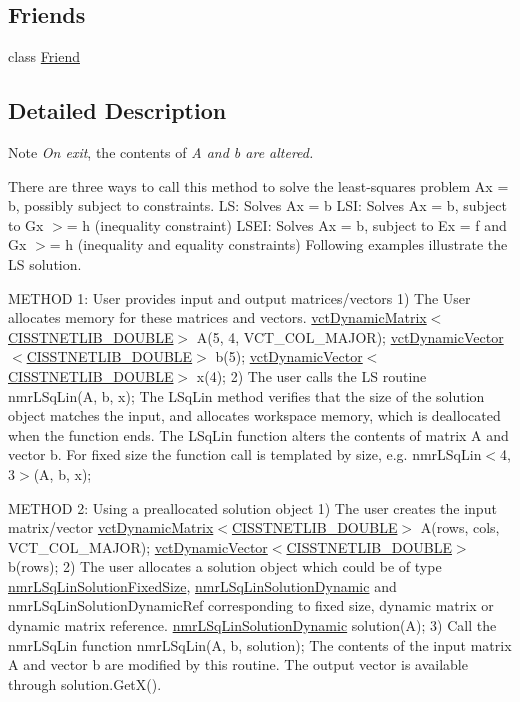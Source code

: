 \subsection*{Friends}
\begin{DoxyCompactItemize}
\item 
class \hyperlink{classnmr_l_sq_lin_solution_dynamic_a7f8321d57e81bc613d5dbef3410ba70e}{Friend}
\end{DoxyCompactItemize}


\subsection{Detailed Description}
\begin{DoxyNote}{Note}
{\itshape On exit}, the contents of {\itshape A and b are altered.}
\end{DoxyNote}
There are three ways to call this method to solve the least-\/squares problem Ax = b, possibly subject to constraints. L\-S\-: Solves Ax = b L\-S\-I\-: Solves Ax = b, subject to Gx $>$= h (inequality constraint) L\-S\-E\-I\-: Solves Ax = b, subject to Ex = f and Gx $>$= h (inequality and equality constraints) Following examples illustrate the L\-S solution.

M\-E\-T\-H\-O\-D 1\-: User provides input and output matrices/vectors 1) The User allocates memory for these matrices and vectors. \hyperlink{classvct_dynamic_matrix}{vct\-Dynamic\-Matrix$<$\-C\-I\-S\-S\-T\-N\-E\-T\-L\-I\-B\-\_\-\-D\-O\-U\-B\-L\-E$>$} A(5, 4, V\-C\-T\-\_\-\-C\-O\-L\-\_\-\-M\-A\-J\-O\-R); \hyperlink{classvct_dynamic_vector}{vct\-Dynamic\-Vector$<$\-C\-I\-S\-S\-T\-N\-E\-T\-L\-I\-B\-\_\-\-D\-O\-U\-B\-L\-E$>$} b(5); \hyperlink{classvct_dynamic_vector}{vct\-Dynamic\-Vector$<$\-C\-I\-S\-S\-T\-N\-E\-T\-L\-I\-B\-\_\-\-D\-O\-U\-B\-L\-E$>$} x(4); 2) The user calls the L\-S routine nmr\-L\-Sq\-Lin(\-A, b, x); The L\-Sq\-Lin method verifies that the size of the solution object matches the input, and allocates workspace memory, which is deallocated when the function ends. The L\-Sq\-Lin function alters the contents of matrix A and vector b. For fixed size the function call is templated by size, e.\-g. nmr\-L\-Sq\-Lin$<$4, 3$>$(\-A, b, x);

M\-E\-T\-H\-O\-D 2\-: Using a preallocated solution object 1) The user creates the input matrix/vector \hyperlink{classvct_dynamic_matrix}{vct\-Dynamic\-Matrix$<$\-C\-I\-S\-S\-T\-N\-E\-T\-L\-I\-B\-\_\-\-D\-O\-U\-B\-L\-E$>$} A(rows, cols, V\-C\-T\-\_\-\-C\-O\-L\-\_\-\-M\-A\-J\-O\-R); \hyperlink{classvct_dynamic_vector}{vct\-Dynamic\-Vector$<$\-C\-I\-S\-S\-T\-N\-E\-T\-L\-I\-B\-\_\-\-D\-O\-U\-B\-L\-E$>$} b(rows); 2) The user allocates a solution object which could be of type \hyperlink{classnmr_l_sq_lin_solution_fixed_size}{nmr\-L\-Sq\-Lin\-Solution\-Fixed\-Size}, \hyperlink{classnmr_l_sq_lin_solution_dynamic}{nmr\-L\-Sq\-Lin\-Solution\-Dynamic} and nmr\-L\-Sq\-Lin\-Solution\-Dynamic\-Ref corresponding to fixed size, dynamic matrix or dynamic matrix reference. \hyperlink{classnmr_l_sq_lin_solution_dynamic}{nmr\-L\-Sq\-Lin\-Solution\-Dynamic} solution(\-A); 3) Call the nmr\-L\-Sq\-Lin function nmr\-L\-Sq\-Lin(\-A, b, solution); The contents of the input matrix A and vector b are modified by this routine. The output vector is available through solution.\-Get\-X().

